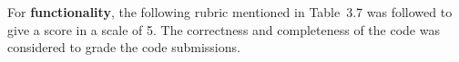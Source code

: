 



\newpage

For \textbf{functionality}, the following rubric mentioned in
Table~3.7 was followed to give a score in a scale of 5. The
correctness and completeness of the code was considered to
grade the code submissions.

